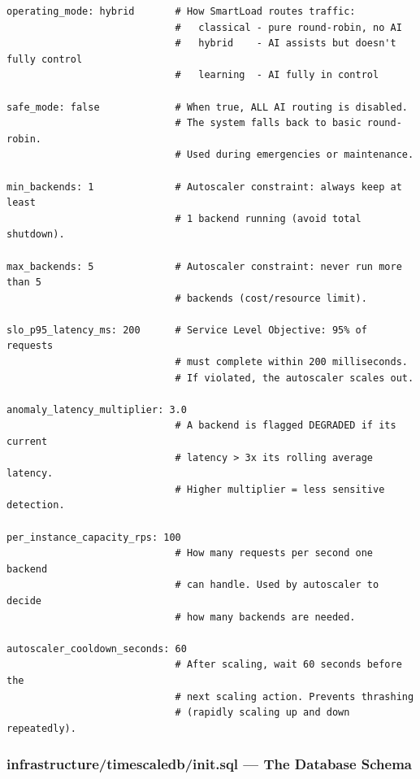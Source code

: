\documentclass[12pt, a4paper]{article}
\begin{document}
\begin{lstlisting}[style=yaml, caption={config/policy.yaml}]
operating_mode: hybrid       # How SmartLoad routes traffic:
                             #   classical - pure round-robin, no AI
                             #   hybrid    - AI assists but doesn't fully control
                             #   learning  - AI fully in control

safe_mode: false             # When true, ALL AI routing is disabled.
                             # The system falls back to basic round-robin.
                             # Used during emergencies or maintenance.

min_backends: 1              # Autoscaler constraint: always keep at least
                             # 1 backend running (avoid total shutdown).

max_backends: 5              # Autoscaler constraint: never run more than 5
                             # backends (cost/resource limit).

slo_p95_latency_ms: 200      # Service Level Objective: 95% of requests
                             # must complete within 200 milliseconds.
                             # If violated, the autoscaler scales out.

anomaly_latency_multiplier: 3.0
                             # A backend is flagged DEGRADED if its current
                             # latency > 3x its rolling average latency.
                             # Higher multiplier = less sensitive detection.

per_instance_capacity_rps: 100
                             # How many requests per second one backend
                             # can handle. Used by autoscaler to decide
                             # how many backends are needed.

autoscaler_cooldown_seconds: 60
                             # After scaling, wait 60 seconds before the
                             # next scaling action. Prevents thrashing
                             # (rapidly scaling up and down repeatedly).
\end{lstlisting}

\subsubsection{infrastructure/timescaledb/init.sql --- The Database Schema}
\end{document}
